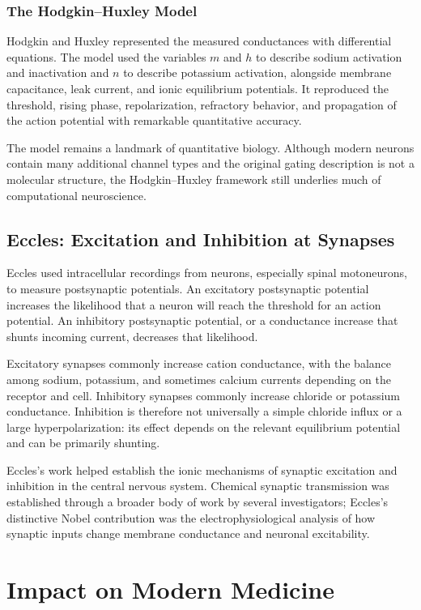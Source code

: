 \subsubsection{The Hodgkin--Huxley Model}

Hodgkin and Huxley represented the measured conductances with differential equations. The model used the variables $m$ and $h$ to describe sodium activation and inactivation and $n$ to describe potassium activation, alongside membrane capacitance, leak current, and ionic equilibrium potentials. It reproduced the threshold, rising phase, repolarization, refractory behavior, and propagation of the action potential with remarkable quantitative accuracy.

The model remains a landmark of quantitative biology. Although modern neurons contain many additional channel types and the original gating description is not a molecular structure, the Hodgkin--Huxley framework still underlies much of computational neuroscience.

\subsection{Eccles: Excitation and Inhibition at Synapses}

Eccles used intracellular recordings from neurons, especially spinal motoneurons, to measure postsynaptic potentials. An excitatory postsynaptic potential increases the likelihood that a neuron will reach the threshold for an action potential. An inhibitory postsynaptic potential, or a conductance increase that shunts incoming current, decreases that likelihood.

Excitatory synapses commonly increase cation conductance, with the balance among sodium, potassium, and sometimes calcium currents depending on the receptor and cell. Inhibitory synapses commonly increase chloride or potassium conductance. Inhibition is therefore not universally a simple chloride influx or a large hyperpolarization: its effect depends on the relevant equilibrium potential and can be primarily shunting.

Eccles's work helped establish the ionic mechanisms of synaptic excitation and inhibition in the central nervous system. Chemical synaptic transmission was established through a broader body of work by several investigators; Eccles's distinctive Nobel contribution was the electrophysiological analysis of how synaptic inputs change membrane conductance and neuronal excitability.

\section{Impact on Modern Medicine}

